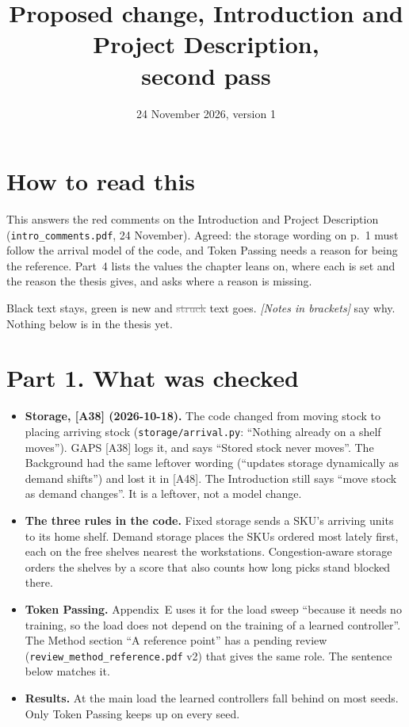 \documentclass[11pt,a4paper]{article}
\title{Proposed change, Introduction and Project Description,\\ second pass}
\date{24 November 2026, version 1}
\newcommand{\new}[1]{\textcolor{newc}{#1}}
\newcommand{\old}[1]{\textcolor{gray}{\sout{#1}}}
\newcommand{\note}[1]{{\small\itshape [#1]}}
\newcommand{\lab}[1]{\textsf{\footnotesize\detokenize{#1}}}
\begin{document}
\sloppy
\maketitle

\section*{How to read this}
This answers the red comments on the Introduction and Project Description
(\texttt{intro\_comments.pdf}, 24 November). Agreed: the storage wording on
p.~1 must follow the arrival model of the code, and Token Passing needs a
reason for being the reference. Part~4 lists the values the chapter leans on,
where each is set and the reason the thesis gives, and asks where a reason is
missing.

Black text stays, \new{green} is new and \old{struck} text goes.
\note{Notes in brackets} say why. Nothing below is in the thesis yet.

\section*{Part 1. What was checked}
\begin{itemize}[nosep]
  \item \textbf{Storage, [A38] (2026-10-18).} The code changed from moving
    stock to placing arriving stock (\texttt{storage/arrival.py}: ``Nothing
    already on a shelf moves''). GAPS [A38] logs it, and
    \lab{sec:pf:scope} says ``Stored stock never moves''. The Background had
    the same leftover wording (``updates storage dynamically as demand
    shifts'') and lost it in [A48]. The Introduction still says ``move stock
    as demand changes''. It is a leftover, not a model change.
  \item \textbf{The three rules in the code.} Fixed storage sends a SKU's
    arriving units to its home shelf. Demand storage places the SKUs ordered
    most lately first, each on the free shelves nearest the workstations.
    Congestion-aware storage orders the shelves by a score that also counts
    how long picks stand blocked there.
  \item \textbf{Token Passing.} Appendix~E uses it for the load sweep
    ``because it needs no training, so the load does not depend on the
    training of a learned controller''. The Method section ``A reference
    point'' has a pending review (\texttt{review\_method\_reference.pdf} v2)
    that gives the same role. The sentence below matches it.
  \item \textbf{Results.} At the main load the learned controllers fall
    behind on most seeds. Only Token Passing keeps up on every seed.
\end{itemize}
\end{document}
